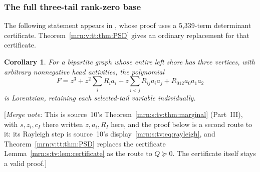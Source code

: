 \documentclass[11pt,a4paper]{article}
\newtheorem{corollary}[theorem]{Corollary}
\theoremstyle{remark}\newtheorem{remark}[theorem]{Remark}
\newcommand{\mnote}[1]{[\textit{Merge note:} #1]}
\begin{document}
\subsubsection{The full three-tail rank-zero base}
The following statement appears in \cite[Theorem 1.1]{b:m10}, whose proof uses a 5,339-term determinant certificate. Theorem~\ref{mrn:v:tt:thm:PSD} gives an ordinary replacement for that certificate.
\begin{corollary}\label{mrn:v:tt:cor:cubic}
For a bipartite graph whose entire left shore has three vertices, with arbitrary nonnegative head activities, the polynomial
\[
 F=z^3+z^2\sum_iR_ia_i+z\sum_{i<j}R_{ij}a_ia_j+R_{012}a_0a_1a_2
\]
is Lorentzian, retaining each selected-tail variable individually.
\end{corollary}
\mnote{This is source~10's Theorem~\ref{mrn:s:tv:thm:marginal} (Part~III),
with $s,z_i,c_I$ there written $z,a_i,R_I$ here, and the proof below is a
second route to it: its Rayleigh step is source~10's
display~\eqref{mrn:s:tv:eq:rayleigh}, and Theorem~\ref{mrn:v:tt:thm:PSD}
replaces the certificate Lemma~\ref{mrn:s:tv:lem:certificate} as the route to
$Q\succeq0$. The certificate itself stays a valid proof.}
\end{document}
